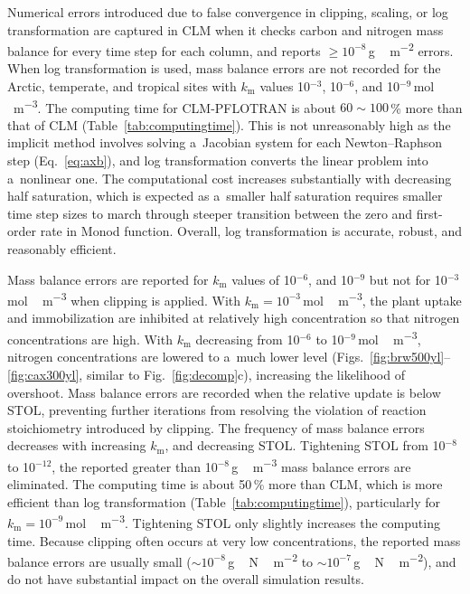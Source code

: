 \documentclass[gmdd, online, hvmath]{copernicus}
\begin{document}
      Numerical errors introduced due to false convergence in clipping,
      scaling, or log transformation are captured in CLM when it checks
      carbon and nitrogen mass balance for every time step for each column,
      and reports $\geq 10^{-8}$\,\unit{g\,m^{-2}} errors.  When log
      transformation is used, mass balance errors are not recorded for the
      Arctic, temperate, and tropical sites with $k_\mathrm{m}$ values
      10$^{-3}$, 10$^{-6}$, and 10$^{-9}$\,\unit{mol\,m^{-3}}. The computing
      time for CLM-PFLOTRAN is about $60 \sim 100$\,{\%} more than that of
      CLM (Table~\ref{tab:computingtime}). This is not unreasonably high as
      the implicit method involves solving a~Jacobian system for each
      Newton--Raphson step (Eq.~\ref{eq:axb}), and log transformation
      converts the linear problem into a~nonlinear one. The computational
      cost increases substantially with decreasing half saturation, which is
      expected as a~smaller half saturation requires smaller time step sizes
      to march through steeper transition between the zero and first-order
      rate in Monod function. Overall, log transformation is accurate,
      robust, and reasonably efficient.

      Mass balance errors are reported for $k_\mathrm{m}$ values of
      10$^{-6}$, and 10$^{-9}$ but not for 10$^{-3}$\,\unit{mol\,m^{-3}}
      when clipping is applied.  With $k_\mathrm{m} =
      10^{-3}$\,\unit{mol\,m^{-3}}, the plant uptake and immobilization are
      inhibited at relatively high concentration so that nitrogen
      concentrations are high. With $k_\mathrm{m}$ decreasing from 10$^{-6}$
      to 10$^{-9}$\,\unit{mol\,m^{-3}}, nitrogen concentrations are lowered
      to a~much lower level (Figs.~\ref{fig:brw500yl}--\ref{fig:cax300yl},
      similar to Fig.~\ref{fig:decomp}c), increasing the likelihood of
      overshoot.  Mass balance errors are recorded when the relative update
      is below STOL, preventing further iterations from resolving the
      violation of reaction stoichiometry introduced by clipping. The
      frequency of mass balance errors decreases with increasing
      $k_\mathrm{m}$, and decreasing STOL. Tightening STOL from 10$^{-8}$ to
      10$^{-12}$, the reported greater than 10$^{-8}$\,\unit{g\,m^{-3}} mass
      balance errors are eliminated. The computing time is about 50\,{\%}
      more than CLM, which is more efficient than log transformation
      (Table~\ref{tab:computingtime}), particularly for
      $k_\mathrm{m}=10^{-9}$\,\unit{mol\,m^{-3}}. Tightening STOL only
      slightly increases the computing time. Because clipping often occurs
      at very low concentrations, the reported mass balance errors are
      usually small ($\sim 10 ^{-8}$\,\unit{g\,N\,m^{-2}} to $\sim 10
      ^{-7}$\,\unit{g\,N\,m^{-2}}), and do not have substantial impact on
      the overall simulation results.
\end{document}
